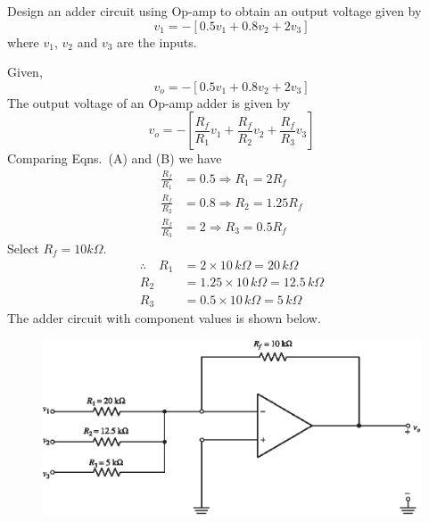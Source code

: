 
\eject

\begin{example}\label{exam5.21}
Design an adder circuit using Op-amp to obtain an output voltage given by
$$
v_{1}=-[0.5v_{1}+0.8v_{2}+2v_{3}]
$$
where $v_{1}$, $v_{2}$ and $v_{3}$ are the inputs.
\end{example}

\begin{solution}
Given,
\begin{equation*}
v_{o}=-[0.5v_{1}+0.8v_{2}+2v_{3}]\tag{A}
\end{equation*}
The output voltage of an Op-amp adder is given by
\begin{equation*}
v_{o}=-\left[\frac{R_{f}}{R_{1}}v_{1}+\frac{R_{f}}{R_{2}}v_{2}+\frac{R_{f}}{R_{3}}v_{3}\right]\tag{B}
\end{equation*}
Comparing Eqns.~(A) and (B) we have
\begin{align*}
\frac{R_{f}}{R_{1}} &= 0.5\Rightarrow R_{1}=2R_{f}\\[3pt]
\frac{R_{f}}{R_{2}} &= 0.8\Rightarrow R_{2}=1.25 R_{f}\\[3pt]
\frac{R_{f}}{R_{3}} &= 2 \Rightarrow R_{3}=0.5 R_{f}
\end{align*}
Select $R_{f}=10 k\Omega$.
\begin{align*}
\therefore\quad R_{1} &= 2\times 10\, k\Omega = 20\,k\Omega\\[3pt]
R_{2} &= 1.25 \times 10\,k\Omega = 12.5\,k\Omega\\[3pt]
R_{3} &= 0.5 \times 10\,k\Omega = 5\,k\Omega
\end{align*}
The adder circuit with component values is shown below.
\begin{figure}[H]
\centering
\includegraphics{chap4/S3-EE-06-IN013.eps}
\end{figure}
\vskip -1cm
\end{solution}

